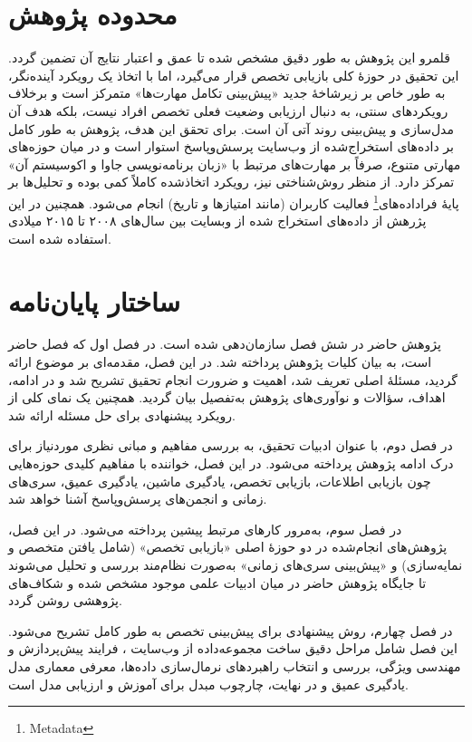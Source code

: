 \section{محدوده پژوهش}

قلمرو این پژوهش به طور دقیق مشخص شده تا عمق و اعتبار نتایج آن تضمین گردد. این تحقیق در حوزهٔ کلی بازیابی تخصص قرار می‌گیرد، اما با اتخاذ یک رویکرد آینده‌نگر، به طور خاص بر زیرشاخهٔ جدید «پیش‌بینی تکامل مهارت‌ها» متمرکز است و برخلاف رویکردهای سنتی، به دنبال ارزیابی وضعیت فعلی تخصص افراد نیست، بلکه هدف آن مدل‌سازی و پیش‌بینی روند آتی آن است. برای تحقق این هدف، پژوهش به طور کامل بر داده‌های استخراج‌شده از وب‌سایت پرسش‌وپاسخ  استوار است و در میان حوزه‌های مهارتی متنوع، صرفاً بر مهارت‌های مرتبط با «زبان برنامه‌نویسی جاوا و اکوسیستم آن» تمرکز دارد. از منظر روش‌شناختی نیز، رویکرد اتخاذشده کاملاً کمی بوده و تحلیل‌ها بر پایهٔ فراداده‌های\footnote{Metadata} فعالیت کاربران (مانند امتیازها و تاریخ) انجام می‌شود. همچنین در این پژرهش از داده‌های استخراج شده از وبسایت  بین سال‌های ۲۰۰۸ تا ۲۰۱۵ میلادی استفاده شده است.

\section{ساختار پایان‌نامه}
پژوهش حاضر در شش فصل سازمان‌دهی شده است. در فصل اول که فصل حاضر است، به بیان کلیات پژوهش پرداخته شد. در این فصل، مقدمه‌ای بر موضوع ارائه گردید، مسئلهٔ اصلی تعریف شد، اهمیت و ضرورت انجام تحقیق تشریح شد و در ادامه، اهداف، سؤالات و نوآوری‌های پژوهش به‌تفصیل بیان گردید. همچنین یک نمای کلی از رویکرد پیشنهادی برای حل مسئله ارائه شد.

در فصل دوم، با عنوان ادبیات تحقیق، به بررسی مفاهیم و مبانی نظری موردنیاز برای درک ادامه پژوهش پرداخته می‌شود. در این فصل، خواننده با مفاهیم کلیدی حوزه‌هایی چون بازیابی اطلاعات، بازیابی تخصص، یادگیری ماشین، یادگیری عمیق، سری‌های زمانی و انجمن‌های پرسش‌وپاسخ آشنا خواهد شد.

در فصل سوم، به‌مرور کارهای مرتبط پیشین پرداخته می‌شود. در این فصل، پژوهش‌های انجام‌شده در دو حوزهٔ اصلی «بازیابی تخصص» (شامل یافتن متخصص و نمایه‌سازی) و «پیش‌بینی سری‌های زمانی» به‌صورت نظام‌مند بررسی و تحلیل می‌شوند تا جایگاه پژوهش حاضر در میان ادبیات علمی موجود مشخص شده و شکاف‌های پژوهشی روشن گردد.

در فصل چهارم، روش پیشنهادی برای پیش‌بینی تخصص به طور کامل تشریح می‌شود. این فصل شامل مراحل دقیق ساخت مجموعه‌داده از وب‌سایت ، فرایند پیش‌پردازش و مهندسی ویژگی، بررسی و انتخاب راهبرد‌های نرمال‌سازی داده‌ها، معرفی معماری مدل یادگیری عمیق و در نهایت، چارچوب مبدل برای آموزش و ارزیابی مدل است.

